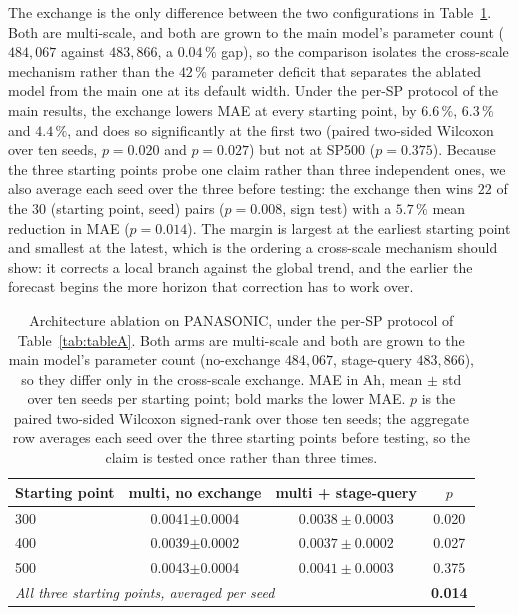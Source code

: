 The exchange is the only difference between the two configurations in
Table~\ref{tab:ablation}. Both are multi-scale, and both are grown to the
main model's parameter count ($484{,}067$ against $483{,}866$, a
$0.04\,\%$ gap), so the comparison isolates the cross-scale mechanism
rather than the $42\,\%$ parameter deficit that separates the ablated
model from the main one at its default width. Under the per-SP protocol
of the main results, the exchange lowers MAE at every starting point, by
$6.6\,\%$, $6.3\,\%$ and $4.4\,\%$, and does so significantly at the
first two (paired two-sided Wilcoxon over ten seeds, $p=0.020$ and
$p=0.027$) but not at SP500 ($p=0.375$). Because the three starting
points probe one claim rather than three independent ones, we also
average each seed over the three before testing: the exchange then wins
$22$ of the $30$ (starting point, seed) pairs ($p=0.008$, sign test)
with a $5.7\,\%$ mean reduction in MAE ($p=0.014$). The margin is
largest at the earliest starting point and smallest at the latest, which
is the ordering a cross-scale mechanism should show: it corrects a local
branch against the global trend, and the earlier the forecast begins the
more horizon that correction has to work over.
\begin{table}[htbp]
\centering
\caption{Architecture ablation on PANASONIC, under the per-SP protocol
of Table~\ref{tab:tableA}. Both arms are multi-scale and both are grown
to the main model's parameter count (no-exchange $484{,}067$,
stage-query $483{,}866$), so they differ only in the cross-scale
exchange. MAE in Ah, mean $\pm$ std over ten seeds per
starting point; bold marks the lower MAE. $p$ is the paired two-sided
Wilcoxon signed-rank over those ten seeds; the aggregate row averages
each seed over the three starting points before testing, so the claim is
tested once rather than three times.}
\label{tab:ablation}
\footnotesize
\setlength{\tabcolsep}{6pt}
\begin{tabular}{lccc}
\toprule
Starting point & multi, no exchange & multi + stage-query & $p$ \\
\midrule
300 & 0.0041$\pm$0.0004 & $\mathbf{0.0038\pm0.0003}$ & 0.020 \\
400 & 0.0039$\pm$0.0002 & $\mathbf{0.0037\pm0.0002}$ & 0.027 \\
500 & 0.0043$\pm$0.0004 & $\mathbf{0.0041\pm0.0003}$ & 0.375 \\
\midrule
\multicolumn{3}{l}{\emph{All three starting points, averaged per seed}} & \textbf{0.014} \\
\bottomrule
\end{tabular}
\end{table}

